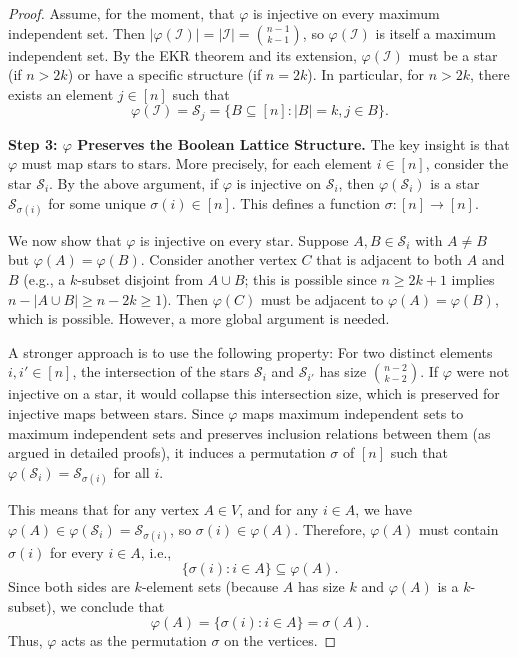 \documentclass[12pt,a4paper,openany]{book}
\begin{document}
\begin{proof}
Assume, for the moment, that $\varphi$ is injective on every maximum independent set. Then $|\varphi(\mathcal{I})| = |\mathcal{I}| = \binom{n-1}{k-1}$, so $\varphi(\mathcal{I})$ is itself a maximum independent set. By the EKR theorem and its extension, $\varphi(\mathcal{I})$ must be a star (if $n > 2k$) or have a specific structure (if $n = 2k$). In particular, for $n > 2k$, there exists an element $j \in [n]$ such that
\[
\varphi(\mathcal{I}) = \mathcal{S}_j = \{ B \subseteq [n] : |B| = k, j \in B \}.
\]

\textbf{Step 3: $\varphi$ Preserves the Boolean Lattice Structure.}
The key insight is that $\varphi$ must map stars to stars. More precisely, for each element $i \in [n]$, consider the star $\mathcal{S}_i$. By the above argument, if $\varphi$ is injective on $\mathcal{S}_i$, then $\varphi(\mathcal{S}_i)$ is a star $\mathcal{S}_{\sigma(i)}$ for some unique $\sigma(i) \in [n]$. This defines a function $\sigma: [n] \to [n]$.

We now show that $\varphi$ is injective on every star. Suppose $A, B \in \mathcal{S}_i$ with $A \neq B$ but $\varphi(A) = \varphi(B)$. Consider another vertex $C$ that is adjacent to both $A$ and $B$ (e.g., a $k$-subset disjoint from $A \cup B$; this is possible since $n \ge 2k+1$ implies $n - |A \cup B| \ge n - 2k \ge 1$). Then $\varphi(C)$ must be adjacent to $\varphi(A) = \varphi(B)$, which is possible. However, a more global argument is needed.

A stronger approach is to use the following property: For two distinct elements $i, i' \in [n]$, the intersection of the stars $\mathcal{S}_i$ and $\mathcal{S}_{i'}$ has size $\binom{n-2}{k-2}$. If $\varphi$ were not injective on a star, it would collapse this intersection size, which is preserved for injective maps between stars. Since $\varphi$ maps maximum independent sets to maximum independent sets and preserves inclusion relations between them (as argued in detailed proofs), it induces a permutation $\sigma$ of $[n]$ such that $\varphi(\mathcal{S}_i) = \mathcal{S}_{\sigma(i)}$ for all $i$.

This means that for any vertex $A \in V$, and for any $i \in A$, we have $\varphi(A) \in \varphi(\mathcal{S}_i) = \mathcal{S}_{\sigma(i)}$, so $\sigma(i) \in \varphi(A)$. Therefore, $\varphi(A)$ must contain $\sigma(i)$ for every $i \in A$, i.e.,
\[
\{ \sigma(i) : i \in A \} \subseteq \varphi(A).
\]
Since both sides are $k$-element sets (because $A$ has size $k$ and $\varphi(A)$ is a $k$-subset), we conclude that
\[
\varphi(A) = \{ \sigma(i) : i \in A \} = \sigma(A).
\]
Thus, $\varphi$ acts as the permutation $\sigma$ on the vertices.


\end{proof}
\end{document}

